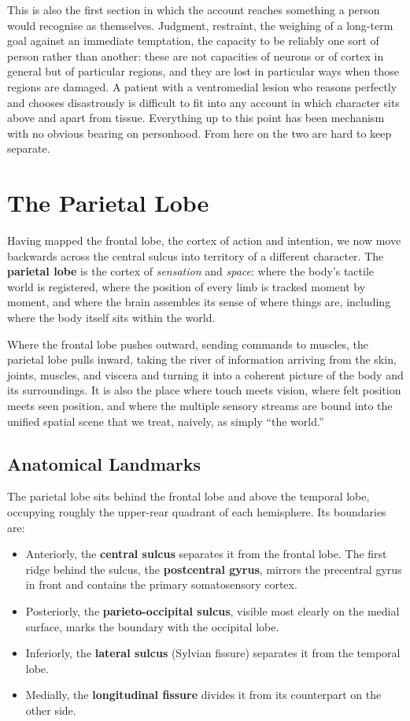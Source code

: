 \documentclass[11pt]{article}
\begin{document}
This is also the first section in which the account reaches something a person would recognise as themselves. Judgment, restraint, the weighing of a long-term goal against an immediate temptation, the capacity to be reliably one sort of person rather than another: these are not capacities of neurons or of cortex in general but of particular regions, and they are lost in particular ways when those regions are damaged. A patient with a ventromedial lesion who reasons perfectly and chooses disastrously is difficult to fit into any account in which character sits above and apart from tissue. Everything up to this point has been mechanism with no obvious bearing on personhood. From here on the two are hard to keep separate.


\section{The Parietal Lobe}

Having mapped the frontal lobe, the cortex of action and intention, we now move backwards across the central sulcus into territory of a different character. The \textbf{parietal lobe} is the cortex of \textit{sensation} and \textit{space}: where the body's tactile world is registered, where the position of every limb is tracked moment by moment, and where the brain assembles its sense of where things are, including where the body itself sits within the world.

Where the frontal lobe pushes outward, sending commands to muscles, the parietal lobe pulls inward, taking the river of information arriving from the skin, joints, muscles, and viscera and turning it into a coherent picture of the body and its surroundings. It is also the place where touch meets vision, where felt position meets seen position, and where the multiple sensory streams are bound into the unified spatial scene that we treat, naively, as simply ``the world.''

\subsection{Anatomical Landmarks}

The parietal lobe sits behind the frontal lobe and above the temporal lobe, occupying roughly the upper-rear quadrant of each hemisphere. Its boundaries are:

\begin{itemize}
    \item Anteriorly, the \textbf{central sulcus} separates it from the frontal lobe. The first ridge behind the sulcus, the \textbf{postcentral gyrus}, mirrors the precentral gyrus in front and contains the primary somatosensory cortex.
    \item Posteriorly, the \textbf{parieto-occipital sulcus}, visible most clearly on the medial surface, marks the boundary with the occipital lobe.
    \item Inferiorly, the \textbf{lateral sulcus} (Sylvian fissure) separates it from the temporal lobe.
    \item Medially, the \textbf{longitudinal fissure} divides it from its counterpart on the other side.
\end{itemize}
\end{document}

